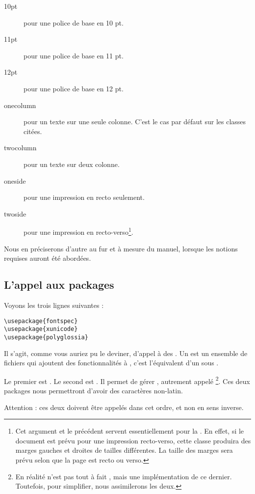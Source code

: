 \begin{description}
\item[10pt] pour une police de base en 10 pt.
\item[11pt] pour une police de base en 11 pt.
\item[12pt] pour une police de base en 12 pt.
\item[onecolumn] pour un texte sur une seule colonne. C'est le cas par défaut sur les classes citées.
\item[twocolumn] pour un texte sur deux colonne.
\item[oneside] pour une impression en recto seulement.
\item[twoside] pour une impression en recto-verso\footnote{Cet argument et le précédent servent essentiellement pour la  . En effet, si le document est prévu pour une impression recto-verso, cette classe produira des marges gauches et droites de tailles différentes. La taille des marges sera prévu selon que la page est recto ou verso.}.
\end{description}

Nous en préciserons d'autre au fur et à mesure du manuel, lorsque les notions requises auront été abordées.

\subsection{L'appel aux packages}

Voyons les trois lignes suivantes : 
\begin{verbatim}
\usepackage{fontspec}
\usepackage{xunicode}
\usepackage{polyglossia}
\end{verbatim}

Il s'agit, comme vous auriez pu le deviner, d'appel à des . Un  est un ensemble de fichiers qui ajoutent des fonctionnalités à \logiciel{\LaTeX}, c'est l'équivalent d'un  sous . 

Le premier  est . Le second  est . Il permet de gérer , autrement appelé \footnote{En réalité  n'est pas tout à fait , mais une implémentation de ce dernier. Toutefois, pour simplifier, nous assimilerons les deux.}. Ces deux packages nous permettront d'avoir des caractères non-latin.

\begin{attention}
Attention : ces deux  doivent être appelés dans cet ordre, et non en sens inverse.
\end{attention}

